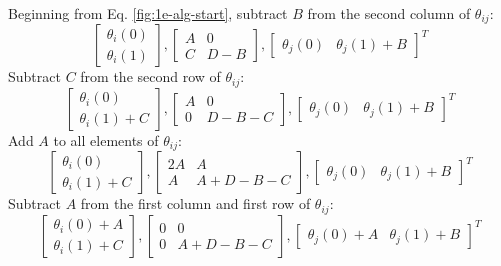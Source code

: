 \documentclass[11pt]{article}
\begin{document}
Beginning from Eq. \ref{fig:1e-alg-start}, subtract $B$ from the second column of $\theta_{ij}$:
\begin{equation}
\begin{bmatrix}
\theta_{i}(0) \\ \theta_{i}(1)
\end{bmatrix},
\begin{bmatrix}
A & 0 \\
C & D - B
\end{bmatrix},
\begin{bmatrix}
\theta_{j}(0) & \theta_{j}(1) + B
\end{bmatrix}^T
\end{equation}
	Subtract $C$ from the second row of $\theta_{ij}$:
\begin{equation}
\begin{bmatrix}
\theta_{i}(0) \\ \theta_{i}(1) + C
\end{bmatrix},
\begin{bmatrix}
A & 0 \\
0 & D - B - C
\end{bmatrix},
\begin{bmatrix}
\theta_{j}(0) & \theta_{j}(1) + B
\end{bmatrix}^T
\end{equation}
	Add $A$ to all elements of $\theta_{ij}$:
\begin{equation}
\begin{bmatrix}
\theta_{i}(0) \\ \theta_{i}(1) + C
\end{bmatrix},
\begin{bmatrix}
2A & A \\
A & A + D - B - C
\end{bmatrix},
\begin{bmatrix}
\theta_{j}(0) & \theta_{j}(1) + B
\end{bmatrix}^T
\end{equation}
	Subtract $A$ from the first column and first row of $\theta_{ij}$:
\begin{equation}
\begin{bmatrix}
\theta_{i}(0) + A \\ \theta_{i}(1) + C
\end{bmatrix},
\begin{bmatrix}
0 & 0 \\
0 & A + D - B - C
\end{bmatrix},
\begin{bmatrix}
\theta_{j}(0) + A & \theta_{j}(1) + B
\end{bmatrix}^T
\end{equation}
\end{document}
